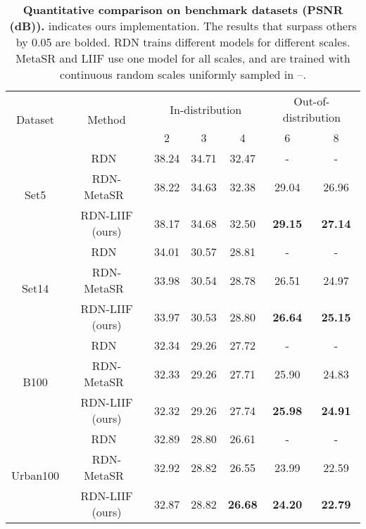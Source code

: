 \documentclass[final]{cvpr}
\begin{document}
\begin{table*}[]
    \centering
    \begin{tabular}{c|c|ccc|cc}
        \multirow{2}{*}{Dataset} & \multirow{2}{*}{Method} & \multicolumn{3}{c|}{In-distribution} & \multicolumn{2}{c}{Out-of-distribution} \\
        & & 2 & 3 & 4 & 6 & 8 \\
        \hline
        \multirow{3}{*}{Set5} & RDN~\cite{zhang2018residual} & 38.24 & 34.71 & 32.47 & - & - \\
        & RDN-MetaSR~\cite{hu2019meta} & 38.22 & 34.63 & 32.38 & 29.04 & 26.96 \\
        & RDN-LIIF (ours) & 38.17 & 34.68 & 32.50 & \textbf{29.15} & \textbf{27.14} \\
        \hline
        \multirow{3}{*}{Set14} & RDN~\cite{zhang2018residual} & 34.01 & 30.57 & 28.81 & - & - \\
        & RDN-MetaSR~\cite{hu2019meta} & 33.98 & 30.54 & 28.78 & 26.51 & 24.97 \\
        & RDN-LIIF (ours) & 33.97 & 30.53 & 28.80 & \textbf{26.64} & \textbf{25.15} \\
        \hline
        \multirow{3}{*}{B100} & RDN~\cite{zhang2018residual} & 32.34 & 29.26 & 27.72 & - & - \\
        & RDN-MetaSR~\cite{hu2019meta} & 32.33 & 29.26 & 27.71 & 25.90 & 24.83 \\
        & RDN-LIIF (ours) & 32.32 & 29.26 & 27.74 & \textbf{25.98} & \textbf{24.91} \\
        \hline
        \multirow{3}{*}{Urban100} & RDN~\cite{zhang2018residual} & 32.89 & 28.80 & 26.61 & - & - \\
        & RDN-MetaSR~\cite{hu2019meta} & 32.92 & 28.82 & 26.55 & 23.99 & 22.59 \\
        & RDN-LIIF (ours) & 32.87 & 28.82 & \textbf{26.68} & \textbf{24.20} & \textbf{22.79} \\
    \end{tabular}
    \caption{\textbf{Quantitative comparison on benchmark datasets (PSNR (dB)).}  indicates ours implementation. The results that surpass others by 0.05 are bolded. RDN trains different models for different scales. MetaSR and LIIF use one model for all scales, and are trained with continuous random scales uniformly sampled in --.}
    \label{tab:benchmark}
\end{table*}
\end{document}
